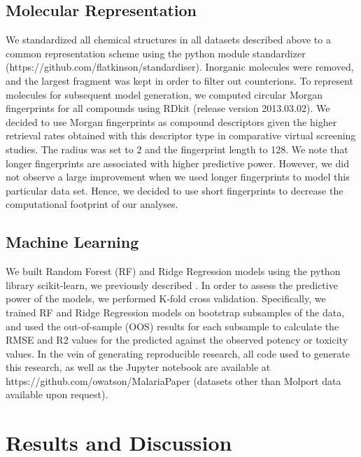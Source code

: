 \documentclass{article}
\begin{document}
\subsection{Molecular Representation}
We standardized all chemical structures in all datasets described above to a common representation scheme using the python module standardizer (https://github.com/flatkinson/standardiser). Inorganic molecules were removed, and the largest fragment was kept in order to filter out counterions\cite{Fourches2010}. 
To represent molecules for subsequent model generation, we computed circular Morgan fingerprints\cite{Rogers2010} for all compounds using RDkit (release version 2013.03.02)\cite{rdkit}. We decided to use Morgan fingerprints as compound descriptors given the higher retrieval rates obtained with this descriptor type in comparative virtual screening studies\cite{Koutsoukas2013}. The radius was set to 2 and the fingerprint length to 128. We note that longer fingerprints are associated with higher predictive power\cite{OBoyle2016}. However, we did not observe a large improvement when we used longer fingerprints to model this particular data set. Hence, we decided to use short fingerprints to decrease the computational footprint of our analyses. 

\subsection{Machine Learning}
We built Random Forest (RF) and Ridge Regression models using the python library scikit-learn\cite{scikit}, we previously described \citep{et1:}.
In order to assess the predictive power of the models, we performed K-fold cross validation. Specifically, 
we trained RF and Ridge Regression models on bootstrap subsamples of the data, and used the out-of-sample (OOS) results for each subsample to calculate the RMSE and R2 values for the predicted against the observed potency or toxicity values.
In the vein of generating reproducible research\cite{Walters2013,Landrum2012}, all code used to generate this research, as well as the Jupyter notebook are available at https://github.com/owatson/MalariaPaper (datasets other than Molport data available upon request).




\section{Results and Discussion}
\end{document}
